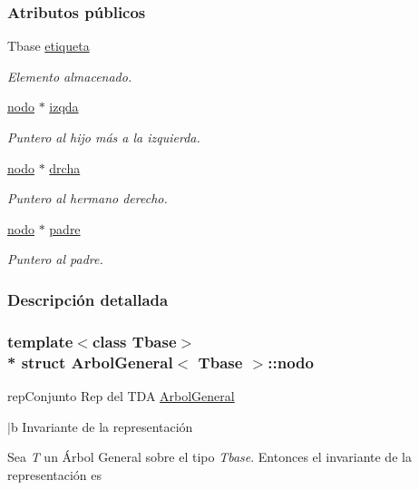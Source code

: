 \subsubsection*{Atributos públicos}
\begin{DoxyCompactItemize}
\item 
Tbase \hyperlink{structArbolGeneral_1_1nodo_ab7223965c5a62aa93895f3decd7a109a}{etiqueta}
\begin{DoxyCompactList}\small\item\em Elemento almacenado. \end{DoxyCompactList}\item 
\hyperlink{structArbolGeneral_1_1nodo}{nodo} $\ast$ \hyperlink{structArbolGeneral_1_1nodo_a3b8075b9fd0dc27c2272ba48bd9a9221}{izqda}
\begin{DoxyCompactList}\small\item\em Puntero al hijo más a la izquierda. \end{DoxyCompactList}\item 
\hyperlink{structArbolGeneral_1_1nodo}{nodo} $\ast$ \hyperlink{structArbolGeneral_1_1nodo_a8d0a58447171461212942f9308ef4f36}{drcha}
\begin{DoxyCompactList}\small\item\em Puntero al hermano derecho. \end{DoxyCompactList}\item 
\hyperlink{structArbolGeneral_1_1nodo}{nodo} $\ast$ \hyperlink{structArbolGeneral_1_1nodo_ab4d70a0179e8450b2842bbf1a6481402}{padre}
\begin{DoxyCompactList}\small\item\em Puntero al padre. \end{DoxyCompactList}\end{DoxyCompactItemize}


\subsubsection{Descripción detallada}
\subsubsection*{template$<$class Tbase$>$\\*
struct Arbol\+General$<$ Tbase $>$\+::nodo}

rep\+Conjunto Rep del T\+DA \hyperlink{classArbolGeneral}{Arbol\+General} 

$\vert$b Invariante de la representación

Sea {\itshape T} un Árbol General sobre el tipo {\itshape Tbase}. Entonces el invariante de la representación es

